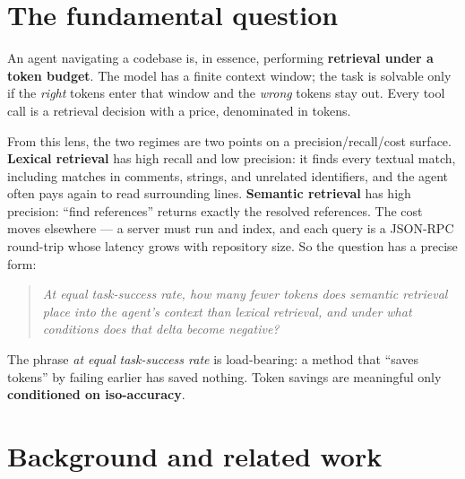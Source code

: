 \documentclass[11pt]{article}
\newcommand{\code}[1]{\texttt{#1}}
\begin{document}
\begin{abstract}
exclude. The most robust finding is that the agent's tool choice is \textbf{task-dependent}: it defaults to
\code{grep} on localization (semantic-tool use $0$--$6\%$) but reaches for the LSP about half the time on
reference tasks ($45$--$57\%$), \emph{unprompted}. The grep preference is not a fixed bias but a learned,
task-shaped policy. This argues not for ``LSP-always'' but for an \emph{adaptive router} keyed on task
class, model capability, and lexical noise --- and, since that routing competence is demonstrably already
present in latent form, for reinforcing it into the policy rather than bolting on the tool.
\end{abstract}

\section{The fundamental question}

An agent navigating a codebase is, in essence, performing \textbf{retrieval under a token budget}. The
model has a finite context window; the task is solvable only if the \emph{right} tokens enter that
window and the \emph{wrong} tokens stay out. Every tool call is a retrieval decision with a price,
denominated in tokens.

From this lens, the two regimes are two points on a precision/recall/cost surface. \textbf{Lexical
retrieval} has high recall and low precision: it finds every textual match, including matches in
comments, strings, and unrelated identifiers, and the agent often pays again to read surrounding lines.
\textbf{Semantic retrieval} has high precision: ``find references'' returns exactly the resolved
references. The cost moves elsewhere --- a server must run and index, and each query is a JSON-RPC
round-trip whose latency grows with repository size. So the question has a precise form:

\begin{quote}
\textit{At equal task-success rate, how many fewer tokens does semantic retrieval place into the
agent's context than lexical retrieval, and under what conditions does that delta become negative?}
\end{quote}

The phrase \emph{at equal task-success rate} is load-bearing: a method that ``saves tokens'' by failing
earlier has saved nothing. Token savings are meaningful only \textbf{conditioned on iso-accuracy}.

\section{Background and related work}
\end{document}
